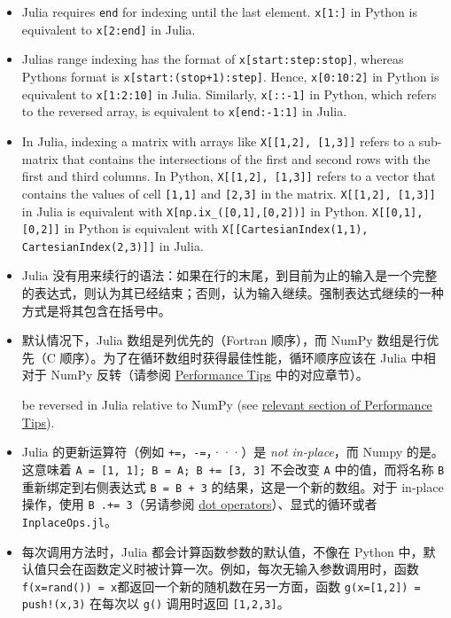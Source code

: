 \begin{itemize}
\item Julia requires \texttt{end} for indexing until the last element. \texttt{x[1:]} in Python is equivalent to \texttt{x[2:end]} in Julia.


\item Julia{\textquotesingle}s range indexing has the format of \texttt{x[start:step:stop]}, whereas Python{\textquotesingle}s format is \texttt{x[start:(stop+1):step]}. Hence, \texttt{x[0:10:2]} in Python is equivalent to \texttt{x[1:2:10]} in Julia. Similarly, \texttt{x[::-1]} in Python, which refers to the reversed array, is equivalent to \texttt{x[end:-1:1]} in Julia.


\item In Julia, indexing a matrix with arrays like \texttt{X[[1,2], [1,3]]} refers to a sub-matrix that contains the intersections of the first and second rows with the first and third columns. In Python, \texttt{X[[1,2], [1,3]]} refers to a vector that contains the values of cell \texttt{[1,1]} and \texttt{[2,3]} in the matrix. \texttt{X[[1,2], [1,3]]} in Julia is equivalent with \texttt{X[np.ix\_([0,1],[0,2])]} in Python. \texttt{X[[0,1], [0,2]]} in Python is equivalent with \texttt{X[[CartesianIndex(1,1), CartesianIndex(2,3)]]} in Julia.


\item Julia 没有用来续行的语法：如果在行的末尾，到目前为止的输入是一个完整的表达式，则认为其已经结束；否则，认为输入继续。强制表达式继续的一种方式是将其包含在括号中。


\item 默认情况下，Julia 数组是列优先的（Fortran 顺序），而 NumPy 数组是行优先（C 顺序）。为了在循环数组时获得最佳性能，循环顺序应该在 Julia 中相对于 NumPy 反转（请参阅 \hyperlink{818954303942149020}{Performance Tips} 中的对应章节）。

be reversed in Julia relative to NumPy (see \hyperlink{11239800376478112527}{relevant section of Performance Tips}).


\item Julia 的更新运算符（例如 \texttt{+=}，\texttt{-=}，···）是 \emph{not in-place}，而 Numpy 的是。这意味着 \texttt{A = [1, 1]; B = A; B += [3, 3]} 不会改变 \texttt{A} 中的值，而将名称 \texttt{B} 重新绑定到右侧表达式 \texttt{B = B + 3} 的结果，这是一个新的数组。对于 in-place 操作，使用 \texttt{B .+= 3}（另请参阅 \hyperlink{15967322336376951940}{dot operators}）、显式的循环或者 \texttt{InplaceOps.jl}。


\item 每次调用方法时，Julia 都会计算函数参数的默认值，不像在 Python 中，默认值只会在函数定义时被计算一次。例如，每次无输入参数调用时，函数\texttt{f(x=rand()) = x}都返回一个新的随机数在另一方面，函数 \texttt{g(x=[1,2]) = push!(x,3)} 在每次以 \texttt{g()} 调用时返回 \texttt{[1,2,3]}。



\end{itemize}
